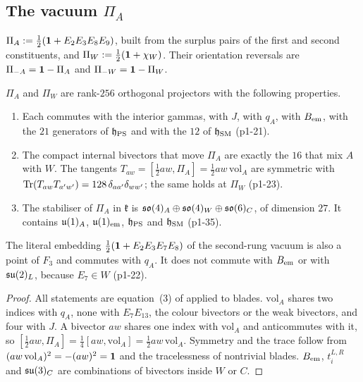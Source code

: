 \subsection{The vacuum \texorpdfstring{$\Pi_A$}{Pi\_A}}
\label{p1:sec:vacuum}

\begin{definition}
\label{p1:def:vacuum}
$\Pi_A:=\tfrac12(\mathbf 1+E_2E_3E_8E_9)$, built from the surplus pairs of the first and second constituents, and $\Pi_W:=\tfrac12(\mathbf 1+\chi_W)$. Their orientation
reversals are $\Pi_{-A}=\mathbf 1-\Pi_A$ and $\Pi_{-W}=\mathbf 1-\Pi_W$.
\end{definition}

\begin{theorem}
\label{p1:thm:vacuum}
$\Pi_A$ and $\Pi_W$ are rank-$256$ orthogonal projectors with the following properties.
\begin{enumerate}[label=(\roman*),leftmargin=2.2em]
\item Each commutes with the interior gammas, with $J$, with $q_A$, with $B_{\rm em}$, with the $21$ generators of $\mathfrak h_{\rm PS}$ and with the $12$ of
$\mathfrak h_{\rm SM}$ (p1-21).
\item The compact internal bivectors that move $\Pi_A$ are exactly the $16$ that mix $A$ with $W$. The tangents $T_{aw}=[\tfrac12aw,\Pi_A]=\tfrac12aw\,\mathrm{vol}_A$ are
symmetric with $\operatorname{Tr}(T_{aw}T_{a'w'})=128\,\delta_{aa'}\delta_{ww'}$; the same holds at $\Pi_W$ (p1-23).
\item The stabiliser of $\Pi_A$ in $\mathfrak k$ is $\mathfrak{so}(4)_A\oplus\mathfrak{so}(4)_W\oplus\mathfrak{so}(6)_C$, of dimension $27$. It contains $\mathfrak{u}(1)_A$, $\mathfrak{u}(1)_{\rm em}$, $\mathfrak h_{\rm PS}$ and
$\mathfrak h_{\rm SM}$ (p1-35).
\end{enumerate}
The literal embedding $\tfrac12(\mathbf 1+E_2E_3E_7E_8)$ of the second-rung vacuum is also a point of $F_3$ and commutes with $q_A$. It does not commute with $B_{\rm em}$ or with
$\mathfrak{su}(2)_L$, because $E_7\in W$ (p1-22).
\end{theorem}

\begin{proof}
All statements are equation~(3) of \cite{ES17} applied to blades. $\mathrm{vol}_A$ shares two indices with $q_A$, none with $E_7E_{13}$, the colour bivectors or the
weak bivectors, and four with $J$. A bivector $aw$ shares one index with $\mathrm{vol}_A$ and anticommutes with it, so
$[\tfrac12aw,\Pi_A]=\tfrac14[aw,\mathrm{vol}_A]=\tfrac12aw\,\mathrm{vol}_A$. Symmetry and the trace follow from $(aw\,\mathrm{vol}_A)^2=-(aw)^2=\mathbf 1$ and the tracelessness of
nontrivial blades. $B_{\rm em}$, $t^{L,R}_i$ and $\mathfrak{su}(3)_C$ are combinations of bivectors inside $W$ or $C$.
\end{proof}


